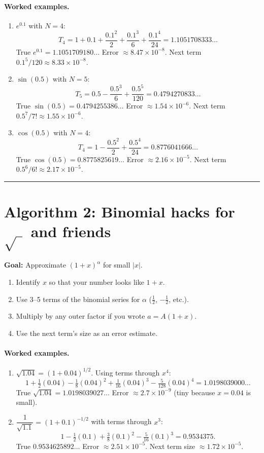 \documentclass[11pt]{article}
\begin{document}
\paragraph{Worked examples.}
\begin{enumerate}[label=\textbf{Ex.\ \arabic*.}]
  \item \(e^{0.1}\) with \(N=4\):
  \[
  T_4=1+0.1+\frac{0.1^2}{2}+\frac{0.1^3}{6}+\frac{0.1^4}{24}=1.1051708333\ldots
  \]
  True \(e^{0.1}=1.1051709180\ldots\) Error \(\approx 8.47\times10^{-8}\). Next term \(0.1^5/120\approx 8.33\times10^{-8}\).
  \item \(\sin(0.5)\) with \(N=5\):
  \[
  T_5=0.5-\frac{0.5^3}{6}+\frac{0.5^5}{120}=0.4794270833\ldots
  \]
  True \(\sin(0.5)=0.4794255386\ldots\) Error \(\approx1.54\times10^{-6}\). Next term \(0.5^7/7!\approx1.55\times10^{-6}\).
  \item \(\cos(0.5)\) with \(N=4\):
  \[
  T_4=1-\frac{0.5^2}{2}+\frac{0.5^4}{24}=0.8776041666\ldots
  \]
  True \(\cos(0.5)=0.8775825619\ldots\) Error \(\approx2.16\times10^{-5}\). Next term \(0.5^6/6!\approx2.17\times10^{-5}\).
\end{enumerate}

\bigskip\hrule\bigskip

\section*{Algorithm 2: Binomial hacks for \(\sqrt{\ \ }\) and friends}
\textbf{Goal:} Approximate \((1+x)^\alpha\) for small \(|x|\).

\begin{enumerate}[label=\textbf{Step \arabic*.}]
  \item Identify \(x\) so that your number looks like \(1+x\).
  \item Use 3--5 terms of the binomial series for \(\alpha\) (\(\tfrac12\), \(-\tfrac12\), etc.).
  \item Multiply by any outer factor if you wrote \(a=A(1+x)\).
  \item Use the next term’s size as an error estimate.
\end{enumerate}

\paragraph{Worked examples.}
\begin{enumerate}[label=\textbf{Ex.\ \arabic*.},resume]
  \item \(\sqrt{1.04}=(1+0.04)^{1/2}\). Using terms through \(x^4\):
  \[
  1+\tfrac12(0.04)-\tfrac18(0.04)^2+\tfrac1{16}(0.04)^3-\tfrac{5}{128}(0.04)^4=1.0198039000\ldots
  \]
  True \(\sqrt{1.04}=1.0198039027\ldots\) Error \(\approx 2.7\times10^{-9}\) (tiny because \(x=0.04\) is small).
  \item \(\dfrac{1}{\sqrt{1.1}}=(1+0.1)^{-1/2}\) with terms through \(x^3\):
  \[
  1-\tfrac12(0.1)+\tfrac{3}{8}(0.1)^2-\tfrac{5}{16}(0.1)^3=0.9534375.
  \]
  True \(0.9534625892\ldots\) Error \(\approx 2.51\times10^{-5}\). Next term size \(\approx 1.72\times10^{-5}\).
\end{enumerate}
\end{document}
